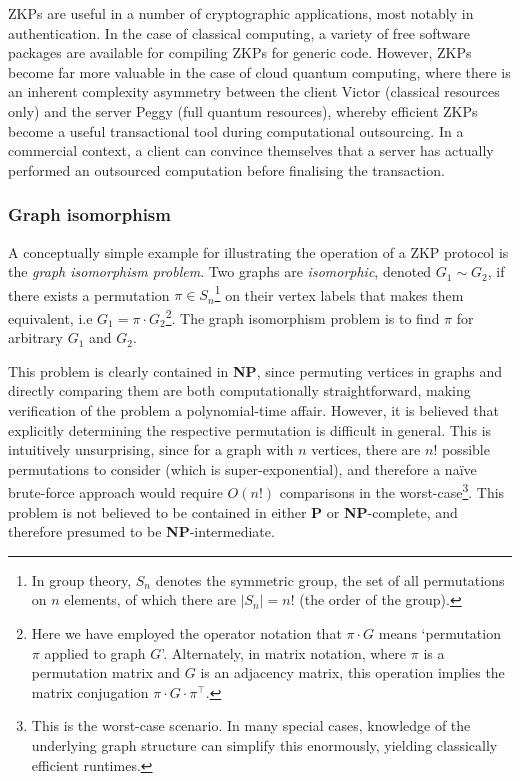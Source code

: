 ZKPs are useful in a number of cryptographic applications, most notably in authentication. In the case of classical computing, a variety of free software packages are available for compiling ZKPs for generic code. However, ZKPs become far more valuable in the case of cloud quantum computing, where there is an inherent complexity asymmetry between the client Victor (classical resources only) and the server Peggy (full quantum resources), whereby efficient ZKPs become a useful transactional tool during computational outsourcing. In a commercial context, a client can convince themselves that a server has actually performed an outsourced computation before finalising the transaction.

\subsubsection{Graph isomorphism}

A conceptually simple example for illustrating the operation of a ZKP protocol is the \textit{graph isomorphism problem}. Two graphs are \textit{isomorphic}, denoted \mbox{$G_1\sim G_2$}, if there exists a permutation \mbox{$\pi\in S_n$}\footnote{In group theory, $S_n$ denotes the symmetric group, the set of all permutations on $n$ elements, of which there are \mbox{$|S_n|=n!$} (the order of the group).} on their vertex labels that makes them equivalent, i.e \mbox{$G_1=\pi\cdot G_2$}\footnote{Here we have employed the operator notation that \mbox{$\pi\cdot G$} means `permutation $\pi$ applied to graph $G$'. Alternately, in matrix notation, where $\pi$ is a permutation matrix and $G$ is an adjacency matrix, this operation implies the matrix conjugation \mbox{$\pi\cdot G\cdot\pi^\top$}.}. The graph isomorphism problem is to find $\pi$ for arbitrary $G_1$ and $G_2$.

This problem is clearly contained in \textbf{NP}, since permuting vertices in graphs and directly comparing them are both computationally straightforward, making verification of the problem a polynomial-time affair. However, it is believed that explicitly determining the respective permutation is difficult in general. This is intuitively unsurprising, since for a graph with $n$ vertices, there are $n!$ possible permutations to consider (which is super-exponential), and therefore a na{\" i}ve brute-force approach would require $O(n!)$ comparisons in the worst-case\footnote{This is the worst-case scenario. In many special cases, knowledge of the underlying graph structure can simplify this enormously, yielding classically efficient runtimes.}. This problem is not believed to be contained in either \textbf{P} or \textbf{NP}-complete, and therefore presumed to be \textbf{NP}-intermediate.


